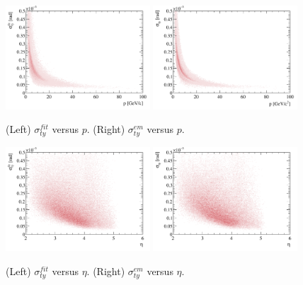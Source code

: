 %
\begin{figure}[h!]
\centering
\includegraphics[width=0.48\textwidth]{figs/ety-fit.pdf}
\includegraphics[width=0.48\textwidth]{figs/ety-em.pdf}
\caption{(Left) $\sigma^{fit}_{ty}$ versus $p$. (Right)
  $\sigma^{em}_{ty}$ versus $p$.}
\label{fig:emtyp}
\end{figure}
%
%
\begin{figure}[h!]
\centering
\includegraphics[width=0.48\textwidth]{figs/ety-eta-fit.pdf}
\includegraphics[width=0.48\textwidth]{figs/ety-eta-em.pdf}
\caption{(Left) $\sigma^{fit}_{ty}$ versus $\eta$. (Right)
  $\sigma^{em}_{ty}$ versus $\eta$.}
\label{fig:emtyeta}
\end{figure}
